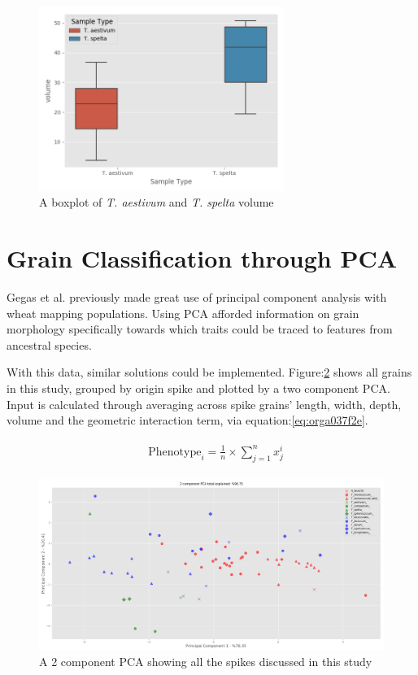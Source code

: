 \documentclass[11pt]{report}
\begin{document}
\begin{figure}[htbp]
\centering
\includegraphics[width=8cm]{./images/results/group3/volume.png}
\caption{\label{fig:org0ebdc9e}
A boxplot of \emph{T. aestivum} and \emph{T. spelta} volume}
\end{figure}



\section{Grain Classification through PCA}
\label{sec:org2473fc8}
Gegas et al. previously made great use of principal component analysis with wheat mapping populations. Using PCA afforded information on grain morphology specifically towards which traits could be traced to features from ancestral species.

With this data, similar solutions could be implemented. Figure:\ref{fig:org8f312b2} shows all grains in this study, grouped by origin spike and plotted by a two component PCA. Input is calculated through averaging across spike grains' length, width, depth, volume and the geometric interaction term, via equation:\ref{eq:orga037f2e}.

 \begin{align}
\label{eq:orga037f2e}
   &\begin{aligned}
\text{Phenotype}_i = \frac{1}{n}\times\sum^n_{j=1}{x^i_j}
   \end{aligned}
 \end{align}


\begin{figure}[htbp]
\centering
\includegraphics[width=.9\linewidth]{./images/pca_all.png}
\caption{\label{fig:org8f312b2}
A 2 component PCA showing all the spikes discussed in this study}
\end{figure}
\end{document}
